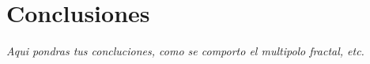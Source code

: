 \documentclass[letterpaper,12pt,oneside]{book}
\begin{document}
    
\mainmatter


% 
%


%
%


%
%



%
%



%
%
\chapter{Conclusiones}  %

\textit{Aqui pondras tus concluciones, como se comporto el multipolo fractal, etc.} 

\clearpage %
{}



\backmatter%
\end{document}
